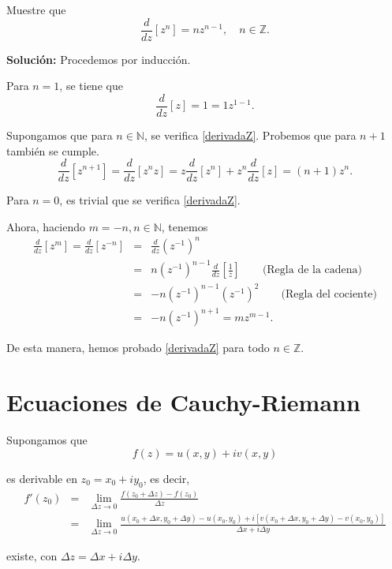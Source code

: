 \begin{ejemplo}
Muestre que
\begin{equation}
\frac{d}{dz}[z^n] = n z^{n-1}, \quad n \in \mathbb{Z}. \label{derivadaZ}
\end{equation}

\textbf{Solución:} Procedemos por inducción.

Para $n = 1$, se tiene que
$$\frac{d}{dz}[z] = 1 = 1 z^{1-1}.$$

Supongamos que para $n \in \mathbb{N}$, se verifica \eqref{derivadaZ}. Probemos que para $n+1$ también se cumple.
\begin{equation*}
\frac{d}{dz}[z^{n+1}] =  \frac{d}{dz}[ z^{n} z] = z \frac{d}{dz}[z^n] + z^n   \frac{d}{dz} [z] = (n+1) z^n.
\end{equation*}

Para $n = 0$, es trivial que se verifica \eqref{derivadaZ}.

Ahora, haciendo $m = -n, n \in \mathbb{N}$, tenemos
\begin{eqnarray*}
\frac{d}{dz}[z^m] = \frac{d}{dz}[z^{-n}] &=& \frac{d}{dz} (z^{-1})^n \\
& =& n (z^{-1})^{n-1} \frac{d}{dz} \left[ \frac{1}{z} \right] \qquad \mbox{(Regla de la cadena)} \\
&=& -n (z^{-1})^{n-1} (z^{-1})^2 \qquad \mbox{(Regla del cociente)} \\
&=& -n (z^{-1})^{n+1} = m z^{m-1}.  
\end{eqnarray*}

De esta manera, hemos probado \eqref{derivadaZ} para todo $n \in \mathbb{Z} $.
\end{ejemplo}

\section{Ecuaciones de Cauchy-Riemann}

Supongamos que
$$f(z) = u(x,y) + iv(x,y)$$

es derivable en $z_0 = x_0 + iy_0$, es decir,
\begin{eqnarray*}
f'(z_0) &=& \lim_{\Delta z \to 0} \frac{f(z_0 + \Delta z) - f(z_0)}{\Delta z} \\
&=& \lim_{\Delta z \to 0} \frac{u(x_0 + \Delta x, y_0 + \Delta y) - u(x_0,y_0) + i [v(x_0 + \Delta x, y_0 + \Delta y) - v(x_0,y_0)]}{\Delta x + i \Delta y} 
\end{eqnarray*}

existe, con $\Delta z = \Delta x + i \Delta y$.

